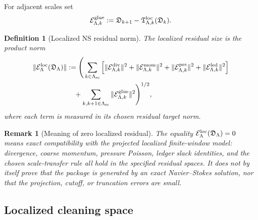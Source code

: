 \documentclass[11pt]{article}
\numberwithin{equation}{section}
\newtheorem{definition}[theorem]{Definition}
\newtheorem{remark}[theorem]{Remark}
\begin{document}
For adjacent scales set
\begin{equation}\label{eq:loc-glue-residual}
        \mathcal E_{\Lambda,k}^{\rm glue}
        :=
        \mathfrak D_{k+1}
        -
        \mathfrak T_{\Lambda,k}^{\rm loc}(\mathfrak D_k).
\end{equation}

\begin{definition}[Localized NS residual norm]\label{def:localized-residual-norm}
The localized residual size is the product norm
\[
\begin{aligned}
        \|\mathcal E_\Lambda^{\rm loc}(\mathfrak D_\Lambda)\|
        &:=
        \Bigg(
        \sum_{k\in\Lambda_{\rm sc}}
        \Big[
        \|\mathcal E_{\Lambda,k}^{\rm div}\|^2
        +
        \|\mathcal E_{\Lambda,k}^{\rm mom}\|^2
        +
        \|\mathcal E_{\Lambda,k}^{\rm prs}\|^2
        +
        \|\mathcal E_{\Lambda,k}^{\rm led}\|^2
        \Big] \\
        &\quad+
        \sum_{\substack{k,k+1\in\Lambda_{\rm sc}}}
        \|\mathcal E_{\Lambda,k}^{\rm glue}\|^2
        \Bigg)^{1/2},
\end{aligned}
\]
where each term is measured in its chosen residual target norm.
\end{definition}

\begin{remark}[Meaning of zero localized residual]
The equality \(\mathcal E_\Lambda^{\rm loc}(\mathfrak D_\Lambda)=0\)
means exact compatibility with the projected localized finite-window model:
divergence, coarse momentum, pressure Poisson, ledger slack identities, and
the chosen scale-transfer rule all hold in the specified residual spaces.
It does not by itself prove that the package is generated by an exact
Navier--Stokes solution, nor that the projection, cutoff, or truncation
errors are small.
\end{remark}

\subsection{Localized cleaning space}\label{subsec:localized-cleaning-space}
\end{document}
